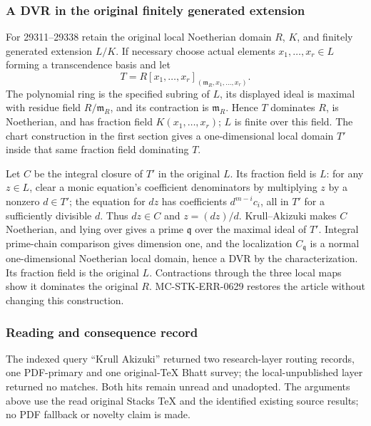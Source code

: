 \subsubsection{A DVR in the original finitely generated extension}\label{algebra-proof-028-a-dvr-in-the-original-finitely-generated-extension}

For 29311--29338 retain the original local Noetherian domain \(R\), \(K\), and finitely generated extension \(L/K\). If necessary choose actual elements \(x_1,\ldots,x_r\in L\) forming a transcendence basis and let \[
 T=R[x_1,\ldots,x_r]_{(\mathfrak m_R,x_1,\ldots,x_r)}.
\] The polynomial ring is the specified subring of \(L\), its displayed ideal is maximal with residue field \(R/\mathfrak m_R\), and its contraction is \(\mathfrak m_R\). Hence \(T\) dominates \(R\), is Noetherian, and has fraction field \(K(x_1,\ldots,x_r)\); \(L\) is finite over this field. The chart construction in the first section gives a one-dimensional local domain \(T'\) inside that same fraction field dominating \(T\).

Let \(C\) be the integral closure of \(T'\) in the original \(L\). Its fraction field is \(L\): for any \(z\in L\), clear a monic equation's coefficient denominators by multiplying \(z\) by a nonzero \(d\in T'\); the equation for \(dz\) has coefficients \(d^{m-i}c_i\), all in \(T'\) for a sufficiently divisible \(d\). Thus \(dz\in C\) and \(z=(dz)/d\). Krull--Akizuki makes \(C\) Noetherian, and lying over gives a prime \(\mathfrak q\) over the maximal ideal of \(T'\). Integral prime-chain comparison gives dimension one, and the localization \(C_{\mathfrak q}\) is a normal one-dimensional Noetherian local domain, hence a DVR by the characterization. Its fraction field is the original \(L\). Contractions through the three local maps show it dominates the original \(R\). MC-STK-ERR-0629 restores the article without changing this construction.

\subsubsection{Reading and consequence record}\label{algebra-proof-028-reading-and-consequence-record}

The indexed query ``Krull Akizuki'' returned two research-layer routing records, one PDF-primary and one original-TeX Bhatt survey; the local-unpublished layer returned no matches. Both hits remain unread and unadopted. The arguments above use the read original Stacks TeX and the identified existing source results; no PDF fallback or novelty claim is made.

